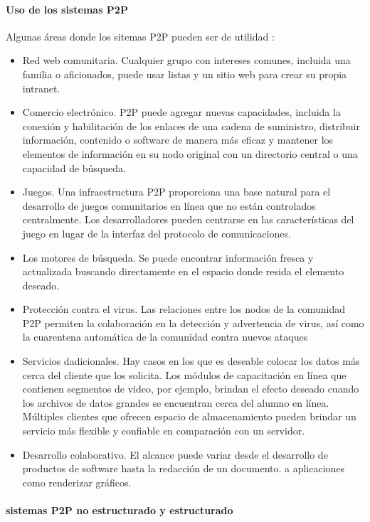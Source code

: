  \paragraph{Uso de los sistemas P2P}
 Algunas \'areas donde los sitemas P2P pueden ser de utilidad \cite{Bernstein1985}:
\begin{itemize}
	\item Red web comunitaria. Cualquier grupo con intereses comunes, incluida una familia o aficionados, puede usar listas y un sitio web para crear su propia intranet.
	\item Comercio electrónico. P2P puede agregar nuevas capacidades, incluida la conexión y habilitación de los enlaces de una cadena de suministro,
	distribuir información, contenido o software de manera más eficaz y mantener los elementos de información en su nodo original
	 con un directorio central o una capacidad de búsqueda.
	\item  Juegos. Una infraestructura P2P proporciona una base natural para el desarrollo de juegos comunitarios en línea 	que no están controlados centralmente. Los desarrolladores pueden centrarse en las características del juego en lugar de la interfaz del 	protocolo de comunicaciones.
	\item  Los motores de búsqueda. Se puede encontrar información fresca y actualizada buscando directamente en el espacio donde resida el elemento deseado.
	\item  Protección contra el virus. Las relaciones entre los nodos de la comunidad P2P permiten la colaboración en la detección y advertencia de virus, así como la cuarentena automática de la comunidad contra nuevos ataques
	\item Servicios dadicionales. Hay casos en los que es deseable colocar los datos más cerca del cliente que los solicita. Los módulos de capacitación en línea que contienen segmentos de video, por ejemplo, brindan el efecto deseado cuando los archivos de datos grandes se encuentran cerca del alumno en línea. Múltiples clientes que ofrecen espacio de almacenamiento pueden brindar un servicio más flexible y confiable en comparación con un servidor.
	\item  Desarrollo colaborativo. El alcance puede variar desde el desarrollo de productos de software hasta la redacción de un documento.
	a aplicaciones como renderizar gráficos.
\end{itemize}


\paragraph{sistemas P2P no estructurado y estructurado}

